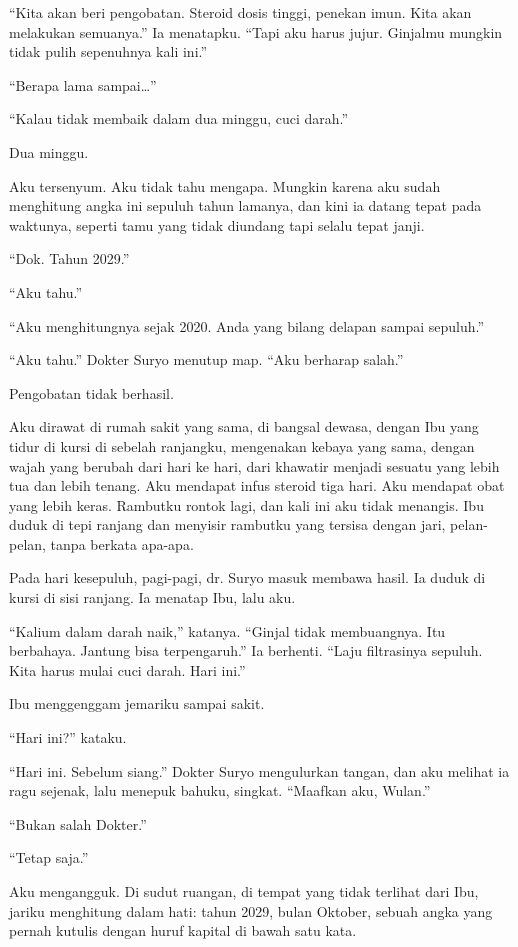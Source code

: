 \documentclass[11pt,twoside,openany]{book}
\makeatletter
\newcommand{\scenebreak}{\par\vspace{0.9em}{\centering\textsc{*\hspace{0.7em}*\hspace{0.7em}*}\par}\vspace{0.9em}\@afterindentfalse\@afterheading}
\makeatother
\begin{document}
``Kita akan beri pengobatan. Steroid dosis tinggi, penekan imun. Kita akan melakukan semuanya.'' Ia menatapku. ``Tapi aku harus jujur. Ginjalmu mungkin tidak pulih sepenuhnya kali ini.''

``Berapa lama sampai\ldots{}''

``Kalau tidak membaik dalam dua minggu, cuci darah.''

Dua minggu.

Aku tersenyum. Aku tidak tahu mengapa. Mungkin karena aku sudah menghitung angka ini sepuluh tahun lamanya, dan kini ia datang tepat pada waktunya, seperti tamu yang tidak diundang tapi selalu tepat janji.

``Dok. Tahun 2029.''

``Aku tahu.''

``Aku menghitungnya sejak 2020. Anda yang bilang delapan sampai sepuluh.''

``Aku tahu.'' Dokter Suryo menutup map. ``Aku berharap salah.''

\scenebreak
Pengobatan tidak berhasil.

Aku dirawat di rumah sakit yang sama, di bangsal dewasa, dengan Ibu yang tidur di kursi di sebelah ranjangku, mengenakan kebaya yang sama, dengan wajah yang berubah dari hari ke hari, dari khawatir menjadi sesuatu yang lebih tua dan lebih tenang. Aku mendapat infus steroid tiga hari. Aku mendapat obat yang lebih keras. Rambutku rontok lagi, dan kali ini aku tidak menangis. Ibu duduk di tepi ranjang dan menyisir rambutku yang tersisa dengan jari, pelan-pelan, tanpa berkata apa-apa.

Pada hari kesepuluh, pagi-pagi, dr. Suryo masuk membawa hasil. Ia duduk di kursi di sisi ranjang. Ia menatap Ibu, lalu aku.

``Kalium dalam darah naik,'' katanya. ``Ginjal tidak membuangnya. Itu berbahaya. Jantung bisa terpengaruh.'' Ia berhenti. ``Laju filtrasinya sepuluh. Kita harus mulai cuci darah. Hari ini.''

Ibu menggenggam jemariku sampai sakit.

``Hari ini?'' kataku.

``Hari ini. Sebelum siang.'' Dokter Suryo mengulurkan tangan, dan aku melihat ia ragu sejenak, lalu menepuk bahuku, singkat. ``Maafkan aku, Wulan.''

``Bukan salah Dokter.''

``Tetap saja.''

Aku mengangguk. Di sudut ruangan, di tempat yang tidak terlihat dari Ibu, jariku menghitung dalam hati: tahun 2029, bulan Oktober, sebuah angka yang pernah kutulis dengan huruf kapital di bawah satu kata.
\end{document}
